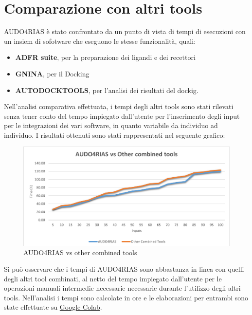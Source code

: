 \section{Comparazione con altri tools}
AUDO4RIAS è stato confrontato da un punto di vista di tempi di esecuzioni con un insiem di sofotware che eseguono le stesse funzionalità, quali:

\begin{itemize}
    \item \textbf{ADFR suite}, per la preparazione dei ligandi e dei recettori
    \item \textbf{GNINA}, per il Docking
    \item \textbf{AUTODOCKTOOLS}, per l'analisi dei risultati del dockig.
\end{itemize}

Nell'analisi comparativa effettuata, i tempi degli altri tools sono stati rilevati senza tener conto del tempo impiegato dall'utente per l'inserimento degli input per le integrazioni dei vari software, in quanto variabile da individuo ad individuo.\newline
I risultati ottenuti sono stati rappresentati nel seguente grafico:

\begin{figure}[H]
    \centering
    \includegraphics[scale=0.9]{immagini/capitolo4/comparazioneTempi.png}
    \caption{AUDO4RIAS vs other combined tools}
    \label{fig:comparazione tempi}
\end{figure}

Si può osservare che i tempi di AUDO4RIAS sono abbastanza in linea con quelli degli altri tool combinati, al netto del tempo impiegato dall'utente per le operazioni manuali intermedie necessarie necessarie durante l'utilizzo degli altri tools.\newline
Nell'analisi i tempi sono calcolate in ore e le elaborazioni per entrambi sono state effettuate su \href{https://colab.research.google.com/}{Google Colab}.